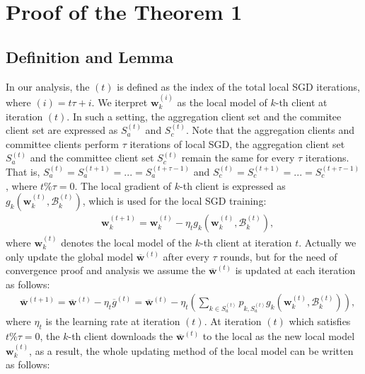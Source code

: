 \documentclass[10pt,journal,compsoc]{IEEEtran}
\newcommand{\w}{\mathbf{w}}
\newcommand{\B}{\mathcal{B}}
\begin{document}
\onecolumn
\appendices
\renewcommand\thesection{\Alph{section}}

\section{Proof of the Theorem 1}
\label{proof}

\subsection{Definition and Lemma}

In our analysis, the $(t)$ is defined as the index of the total local SGD iterations, where $(i) = t\tau + i$. We iterpret $\w_k^{(i)}$ as the local model of $k$-th client at iteration $(t)$. In such a setting, the aggregation client set and the commitee client set are expressed as $S_a^{(t)}$ and $S_c^{(t)}$. Note that the aggregation clients and committee clients perform $\tau$ iterations of local SGD, the aggregation client set $S_a^{(t)}$ and the committee client set $S_c^{(t)}$ remain the same for every $\tau$ iterations. That is, $S_a^{(t)} = S_a^{(t+1)} = ...=S_a^{(t+\tau-1)}$ and $S_c^{(t)} = S_c^{(t+1)} = ...=S_c^{(t+\tau-1)}$, where $t \% \tau = 0$. The local gradient of $k$-th client is expressed as $g_k(\w_k^{(t)},\B_{k}^{(t)})$, which is used for the local SGD training:
\begin{equation}
\begin{split}
&\w_k^{(t+1)} = \w_k^{(t)} - \eta_tg_k(\w_k^{(t)},\B_{k}^{(t)}),
\end{split}
\end{equation}where $\w_k^{(t)}$ denotes the local model of the $k$-th client at iteration $t$. Actually we only update the global model $\overline{\w}^{(t)}$ after every $\tau$ rounds, but for the need of convergence proof and analysis we assume the $\overline{\w}^{(t)}$ is updated at each iteration as follows:
\begin{equation}\label{globalUpdate2}
\begin{split}
&\overline{\w}^{(t+1)} = \overline{\w}^{(t)} - \eta_t\overline{g}^{(t)} = \overline{\w}^{(t)} - \eta_t(\sum_{k\in S^{(t)}_a}p_{k,S_a^{(t)}}g_k(\w_k^{(t)},\B_k^{(t)})),
\end{split}
\end{equation}where $\eta_t$ is the learning rate at iteration $(t)$. At iteration $(t)$ which satisfies $t\%\tau=0$, the $k$-th client downloads the $\overline{\w}^{(t)}$ to the local as the new local model $\w_k^{(t)}$, as a result, the whole updating method of the local model can be written as follows:
\end{document}
